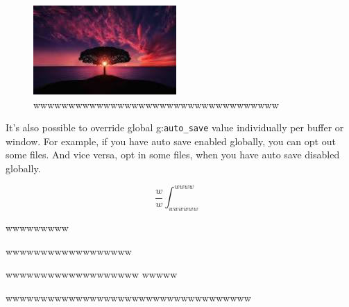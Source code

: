 \documentclass[professionalfont, aspectratio=169]{beamer}
\begin{document}
\begin{frame}
	\begin{figure}
		\begin{center}
			\includegraphics[width=0.3\linewidth]{screenshot002}
		\end{center}
		\caption{wwwwwwwwwwwwwwwwwwwwwwwwwwwwwwwwwww}
		\label{fig:}
	\end{figure}
	It's also possible to override global g:\lstinline{auto_save} value individually per buffer or window. For example, if you have auto save enabled globally, you can opt out some files. And vice versa, opt in some files, when you have auto save disabled globally.


	\begin{equation}
		\frac{w}{w}	\int_{wwwwww}^{wwww}
		\label{www}
	\end{equation}
  
	wwwwwwwww
\end{frame}

\begin{frame}{wwwwwwwwwwwwwwwwww}
	\begin{block}{wwwwwwwwwwwwwwwwwww}
		wwwww
	\end{block}
	wwwwwwwwwwwwwwwwwwwwwwwwwwwwwwwwwww
\end{frame}
\end{document}
